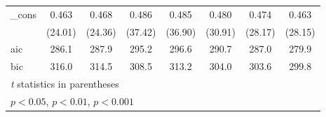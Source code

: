 {\begin{tabular}{l*{7}{c}}
\_cons      &       0.463\sym{***}&       0.468\sym{***}&       0.486\sym{***}&       0.485\sym{***}&       0.480\sym{***}&       0.474\sym{***}&       0.463\sym{***}\\
            &     (24.01)         &     (24.36)         &     (37.42)         &     (36.90)         &     (30.91)         &     (28.17)         &     (28.15)         \\
\hline
aic         &       286.1         &       287.9         &       295.2         &       296.6         &       290.7         &       287.0         &       279.9         \\
bic         &       316.0         &       314.5         &       308.5         &       313.2         &       304.0         &       303.6         &       299.8         \\
\hline\hline
\multicolumn{8}{l}{\footnotesize \textit{t} statistics in parentheses}\\
\multicolumn{8}{l}{\footnotesize \sym{*} \(p<0.05\), \sym{**} \(p<0.01\), \sym{***} \(p<0.001\)}\\
\end{tabular}
}
